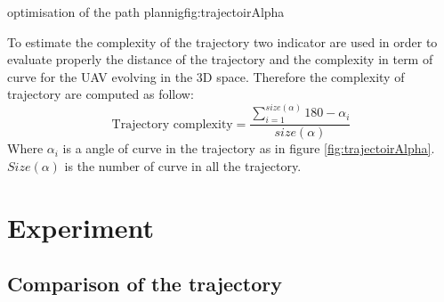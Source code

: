  \begin{mfigures}[!]{optimisation of the path plannig}{fig:trajectoirAlpha} \centering
{}
\end{mfigures} 

To estimate the complexity of the trajectory two indicator are used in order to evaluate properly the distance of the trajectory and the complexity in term of curve for the UAV evolving in the 3D space.
Therefore the complexity of trajectory are computed as follow: 
\begin{equation}\label{Eq:trajectory}
\mbox{Trajectory complexity}=\frac{ \sum_{i=1}^{size(\alpha)} 180- \alpha_{i}  }{size(\alpha)}   
\end{equation}
Where $\alpha_i$ is a angle of curve in the trajectory as in figure \ref{fig:trajectoirAlpha}. \\
$Size(\alpha)$ is the number of curve in all the trajectory.\\

			\section{Experiment}
		\subsection{Comparison of the trajectory} \label{trajectoire path}
 
%  

